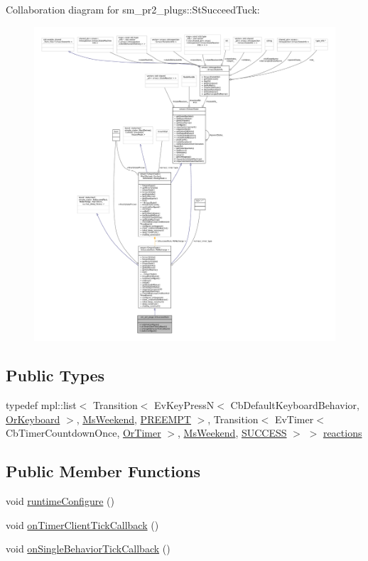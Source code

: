 Collaboration diagram for sm\+\_\+pr2\+\_\+plugs\+:\+:St\+Succeed\+Tuck\+:
\nopagebreak
\begin{figure}[H]
\begin{center}
\leavevmode
\includegraphics[width=350pt]{structsm__pr2__plugs_1_1StSucceedTuck__coll__graph}
\end{center}
\end{figure}
\subsection*{Public Types}
\begin{DoxyCompactItemize}
\item 
typedef mpl\+::list$<$ Transition$<$ Ev\+Key\+PressN$<$ Cb\+Default\+Keyboard\+Behavior, \hyperlink{classsm__pr2__plugs_1_1OrKeyboard}{Or\+Keyboard} $>$, \hyperlink{classsm__pr2__plugs_1_1MsWeekend}{Ms\+Weekend}, \hyperlink{classPREEMPT}{P\+R\+E\+E\+M\+PT} $>$, Transition$<$ Ev\+Timer$<$ Cb\+Timer\+Countdown\+Once, \hyperlink{classsm__pr2__plugs_1_1OrTimer}{Or\+Timer} $>$, \hyperlink{classsm__pr2__plugs_1_1MsWeekend}{Ms\+Weekend}, \hyperlink{classSUCCESS}{S\+U\+C\+C\+E\+SS} $>$ $>$ \hyperlink{structsm__pr2__plugs_1_1StSucceedTuck_a29335cc5a0453dcd24688f4b4fc19993}{reactions}
\end{DoxyCompactItemize}
\subsection*{Public Member Functions}
\begin{DoxyCompactItemize}
\item 
void \hyperlink{structsm__pr2__plugs_1_1StSucceedTuck_a1cdbe59c4fb6a107b2886745c13e6bc1}{runtime\+Configure} ()
\item 
void \hyperlink{structsm__pr2__plugs_1_1StSucceedTuck_af9f7556acf968aaa20d4e3eafda7f3ef}{on\+Timer\+Client\+Tick\+Callback} ()
\item 
void \hyperlink{structsm__pr2__plugs_1_1StSucceedTuck_a2f78ac55b1c5431bfdd20f20c5030815}{on\+Single\+Behavior\+Tick\+Callback} ()
\end{DoxyCompactItemize}

